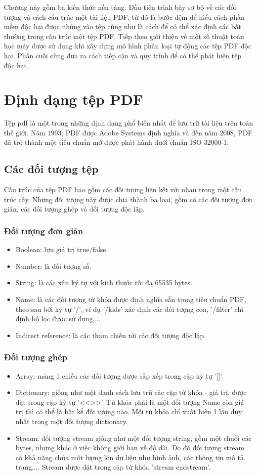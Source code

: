 \documentclass[./../main.tex]{subfiles}
\begin{document}
Chương này gồm ba kiến thức nền tảng. Đầu tiên trình bày sơ bộ về các đối tượng và cách cấu trúc một tài liệu PDF, từ đó là bước đệm để hiểu cách phần mềm độc hại được nhúng vào tệp cũng như là cách để có thể xác định các bất thường trong cấu trúc một tệp PDF. Tiếp theo giới thiệu về một số thuật toán học máy được sử dụng khi xây dựng mô hình phân loại tự động các tệp PDF độc hại. Phần cuối cùng đưa ra cách tiếp cận và quy trình để có thể phát hiện tệp độc hại.
\section{Định dạng tệp PDF}
Tệp pdf là một trong những định dạng phổ biến nhất để lưu trữ tài liệu trên toàn thế giới. Năm 1993, PDF được Adobe Systems định nghĩa và đến năm 2008, PDF đã trở thành một tiêu chuẩn mở được phát hành dưới chuẩn ISO 32000-1.
\subsection{Các đối tượng tệp}
Cấu trúc của tệp PDF bao gồm các đối tượng liên kết với nhau trong một cấu trúc cây. Những đối tượng này được chia thành ba loại, gồm có các đối tượng đơn giản, các đối tượng ghép và đối tượng độc lập.
\subsubsection*{Đối tượng đơn giản}
\begin{itemize}
	\item Boolean: lưu giá trị true/false.
	\item Number: là đối tượng số.
	\item String: là các xâu ký tự với kích thước tối đa 65535 bytes.
	\item Name: là các đối tượng từ khóa được định nghĩa sẵn trong tiêu chuẩn PDF, theo sau bởi ký tự '/', ví dụ '/kids' xác định các đối tượng con, '/filter' chỉ định bộ lọc được sử dụng,...
	\item Indirect reference: là các tham chiếu tới các đối tượng độc lập.
\end{itemize}
\subsubsection*{Đối tượng ghép}

\begin{itemize}
	\item Array: mảng 1 chiều các đối tượng được sắp xếp trong cặp ký tự '[]'.
	\item Dictionary: giống như một danh sách lưu trữ các cặp từ khóa - giá trị, được đặt trong cặp ký tự  '<<>>'. Từ khóa phải là một đối tượng Name còn giá trị thì có thể là bất kể đối tượng nào. Mỗi từ khóa chỉ xuất hiện 1 lần duy nhất trong một đối tượng dictionary.
	\item Stream: đối tượng stream giống như một đối tượng string, gồm một chuỗi các bytes, nhưng khác ở việc không giới hạn về độ dài. Do đó đối tượng stream có khả năng chứa một lượng lớn dữ liệu như hình ảnh, các thông tin mô tả trang,... Stream được đặt trong cặp từ khóa 'stream endstream'.
\end{itemize}
\end{document}
